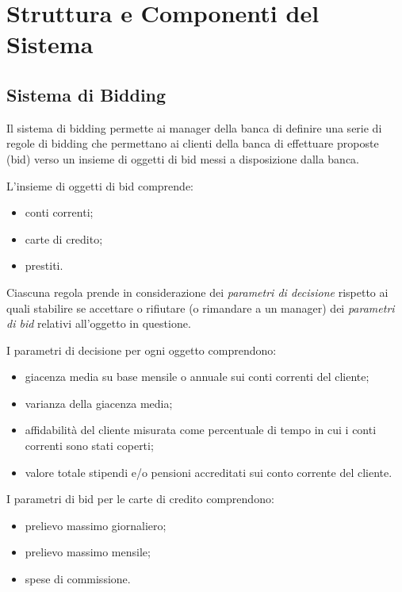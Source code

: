 
\section{Struttura e Componenti del Sistema}

\subsection{Sistema di Bidding}

Il sistema di bidding permette ai manager della banca di definire una serie di regole di bidding che permettano ai clienti della banca di effettuare proposte (bid) verso un insieme di oggetti di bid messi a disposizione dalla banca.

L'insieme di oggetti di bid comprende:
\begin{itemize}
	\item conti correnti;
	\item carte di credito;
	\item prestiti.
\end{itemize}

Ciascuna regola prende in considerazione dei \emph{parametri di decisione} rispetto ai quali stabilire se accettare o rifiutare (o rimandare a un manager) dei \emph{parametri di bid} relativi all'oggetto in questione.

I parametri di decisione per ogni oggetto comprendono:
\begin{itemize}
	\item giacenza media su base mensile o annuale sui conti correnti del cliente;

	\item varianza della giacenza media;

	\item affidabilità del cliente misurata come percentuale di tempo in cui i conti correnti sono stati coperti;

	\item valore totale stipendi e/o pensioni accreditati sui conto corrente del cliente.
\end{itemize}

I parametri di bid per le carte di credito comprendono:
\begin{itemize}
	\item prelievo massimo giornaliero;

	\item prelievo massimo mensile;

	\item spese di commissione.
\end{itemize}

